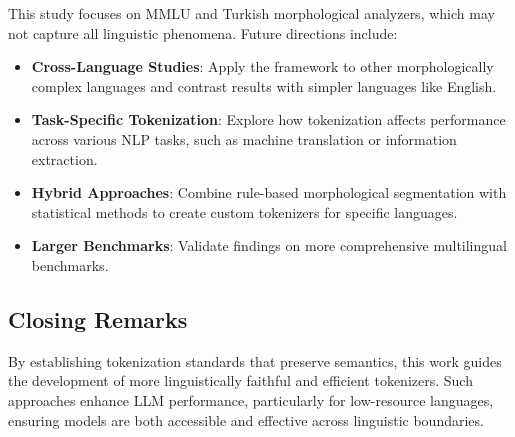   This study focuses on MMLU and Turkish morphological analyzers, which may not capture all linguistic phenomena. Future directions include:
  
  \begin{itemize}
      \item \textbf{Cross-Language Studies}: Apply the framework to other morphologically complex languages and contrast results with simpler languages like English.
      \item \textbf{Task-Specific Tokenization}: Explore how tokenization affects performance across various NLP tasks, such as machine translation or information extraction.
      \item \textbf{Hybrid Approaches}: Combine rule-based morphological segmentation with statistical methods to create custom tokenizers for specific languages.
      \item \textbf{Larger Benchmarks}: Validate findings on more comprehensive multilingual benchmarks.
  \end{itemize}
  
  \subsection{Closing Remarks}
  
  By establishing tokenization standards that preserve semantics, this work guides the development of more linguistically faithful and efficient tokenizers. Such approaches enhance LLM performance, particularly for low-resource languages, ensuring models are both accessible and effective across linguistic boundaries.
  